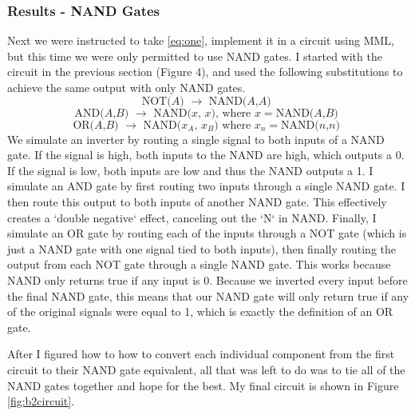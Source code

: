 \documentclass[a4paper,11pt]{article}
\begin{document}
\subsubsection{Results - NAND Gates}
Next we were instructed to take \eqref{eq:one}, implement it in a circuit using MML, but this time we were only permitted to use NAND gates. I started with the circuit in the previous section (Figure 4), and used the following substitutions to achieve the same output with only NAND gates.
\[ \text{NOT($A$) $\to$ NAND($A$,$A$) }\]
\[ \text{AND($A$,$B$) $\to$ NAND($x$, $x$), where $x = $NAND($A$,$B$) } \]
\[ \text{OR($A$,$B$) $\to$ NAND($x_A$, $x_B$) where $x_n = $NAND($n$,$n$) }\]
We simulate an inverter by routing a single signal to both inputs of a NAND gate. If the signal is high, both inputs to the NAND are high, which outputs a 0. If the signal is low, both inputs are low and thus the NAND outputs a 1.
I simulate an AND gate by first routing two inputs through a single NAND gate. I then route this output to both inputs of another NAND gate. This effectively creates a `double negative` effect, canceling out the `N` in NAND.
Finally, I simulate an OR gate by routing each of the inputs through a NOT gate (which is just a NAND gate with one signal tied to both inputs), then finally routing the output from each NOT gate through a single NAND gate. This works because NAND only returns true if any input is 0. Because we inverted every input before the final NAND gate, this means that our NAND gate will only return true if any of the original signals were equal to 1, which is exactly the definition of an OR gate.

After I figured how to how to convert each individual component from the first circuit to their NAND gate equivalent, all that was left to do was to tie all of the NAND gates together and hope for the best. My final circuit is shown in Figure \ref{fig:b2circuit}.  
\end{document}
